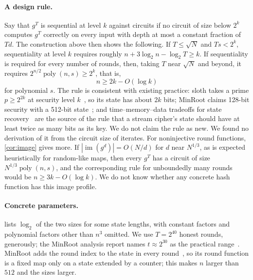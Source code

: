 \documentclass[11pt]{article}
\theoremstyle{definition}
\theoremstyle{remark}
\newcommand{\poly}{\operatorname{poly}}
\numberwithin{equation}{section}
\begin{document}
\paragraph{A design rule.}
Say that $g^T$ is sequential at level $k$ against circuits if no circuit
of size below $2^k$ computes $g^T$ correctly on every input with depth at
most a constant fraction of $Td$.  The construction above then shows the
following.  If $T\leq\sqrt N$ and $Ts<2^k$, sequentiality at level $k$ requires
roughly $n+3\log_2n-\log_2T\geq k$.  If sequentiality is required for every number
of rounds, then, taking $T$ near $\sqrt N$ and beyond, it requires
$2^{n/2}\poly(n,s)\geq2^k$, that is,
\[
  n\geq 2k-O(\log k)
\]
for polynomial $s$.  The rule is consistent with existing practice: sloth
takes a prime $p\geq2^{2k}$ at security level $k$~\cite[Section~3.3]{LW15},
so its state has about $2k$ bits; MinRoot claims 128-bit security with a
512-bit state~\cite[Claim~1]{KMT22}; and time--memory--data tradeoffs for
state recovery~\cite{BS00} are the source of the rule that a stream cipher's
state should have at least twice as many bits as its key.  We do not claim
the rule as new.  We found no derivation of it from the circuit size of
iterates.  For noninjective round functions, \cref{cor:image} gives more.
If $|\operatorname{im}(g^d)|=O(N/d)$ for $d$ near $N^{1/3}$, as is expected
heuristically for random-like maps, then every $g^T$ has a circuit of size
$N^{1/3}\poly(n,s)$, and the corresponding rule for unboundedly many rounds
would be $n\geq3k-O(\log k)$.  We do not know whether any concrete hash
function has this image profile.

\paragraph{Concrete parameters.}
 lists $\log_2$ of the two sizes for some state lengths,
with constant factors and polynomial factors other than $n^3$ omitted.
We use $T=2^{40}$ honest rounds, generously; the MinRoot analysis report
names $t\approx2^{30}$ as the practical range~\cite[Section~4.2.4]{MinRoot23}.
MinRoot adds the round index to the state in every
round~\cite[Section~4.1.2]{MinRoot23}, so its round function is a fixed map
only on a state extended by a counter; this makes $n$ larger than $512$ and
the sizes larger.
\end{document}
